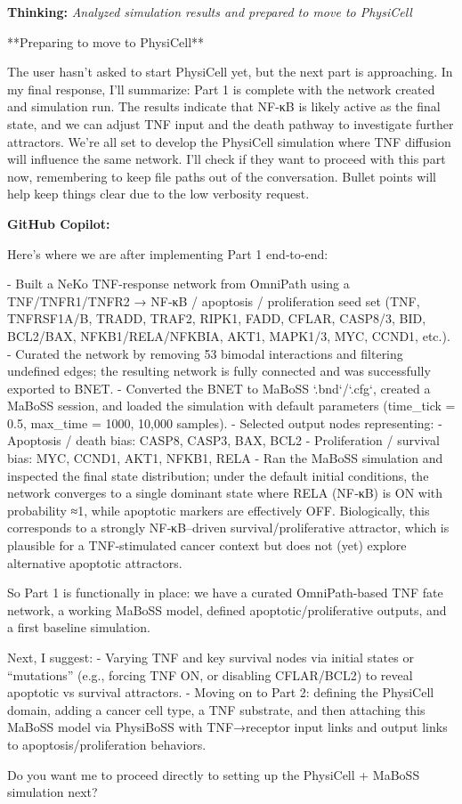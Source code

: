 \documentclass[11pt,a4paper]{article}
\begin{document}
\begin{thinkbox}
\textbf{Thinking:} \textit{Analyzed simulation results and prepared to move to PhysiCell}

**Preparing to move to PhysiCell**

The user hasn't asked to start PhysiCell yet, but the next part is approaching. In my final response, I'll summarize: Part 1 is complete with the network created and simulation run. The results indicate that NF-κB is likely active as the final state, and we can adjust TNF input and the death pathway to investigate further attractors. We're all set to develop the PhysiCell simulation where TNF diffusion will influence the same network. I'll check if they want to proceed with this part now, remembering to keep file paths out of the conversation. Bullet points will help keep things clear due to the low verbosity request.

\end{thinkbox}
\begin{copilotbox}
\textbf{GitHub Copilot:}

Here’s where we are after implementing Part 1 end‑to‑end:

- Built a NeKo TNF-response network from OmniPath using a TNF/TNFR1/TNFR2 → NF‑κB / apoptosis / proliferation seed set (TNF, TNFRSF1A/B, TRADD, TRAF2, RIPK1, FADD, CFLAR, CASP8/3, BID, BCL2/BAX, NFKB1/RELA/NFKBIA, AKT1, MAPK1/3, MYC, CCND1, etc.).
- Curated the network by removing 53 bimodal interactions and filtering undefined edges; the resulting network is fully connected and was successfully exported to BNET.
- Converted the BNET to MaBoSS `.bnd`/`.cfg`, created a MaBoSS session, and loaded the simulation with default parameters (time\_tick = 0.5, max\_time = 1000, 10,000 samples).
- Selected output nodes representing:
  - Apoptosis / death bias: CASP8, CASP3, BAX, BCL2
  - Proliferation / survival bias: MYC, CCND1, AKT1, NFKB1, RELA
- Ran the MaBoSS simulation and inspected the final state distribution; under the default initial conditions, the network converges to a single dominant state where RELA (NF‑κB) is ON with probability ≈1, while apoptotic markers are effectively OFF. Biologically, this corresponds to a strongly NF‑κB–driven survival/proliferative attractor, which is plausible for a TNF‑stimulated cancer context but does not (yet) explore alternative apoptotic attractors.

So Part 1 is functionally in place: we have a curated OmniPath-based TNF fate network, a working MaBoSS model, defined apoptotic/proliferative outputs, and a first baseline simulation.

Next, I suggest:
- Varying TNF and key survival nodes via initial states or “mutations” (e.g., forcing TNF ON, or disabling CFLAR/BCL2) to reveal apoptotic vs survival attractors.
- Moving on to Part 2: defining the PhysiCell domain, adding a cancer cell type, a TNF substrate, and then attaching this MaBoSS model via PhysiBoSS with TNF→receptor input links and output links to apoptosis/proliferation behaviors.

Do you want me to proceed directly to setting up the PhysiCell + MaBoSS simulation next?

\end{copilotbox}
\end{document}
